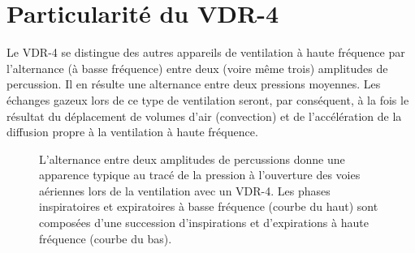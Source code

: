 \section{Particularité du VDR-4}
Le VDR-4 se distingue des autres appareils de ventilation à haute fréquence par l’alternance (à basse fréquence) entre deux (voire même trois) amplitudes de percussion. Il en résulte une alternance entre deux pressions moyennes. Les échanges gazeux lors de ce type de ventilation seront, par conséquent, à la fois le résultat du déplacement de volumes d’air (convection) et de l’accélération de la diffusion propre à la ventilation à haute fréquence.

\begin{figure}
	
	\caption{L’alternance entre deux amplitudes de percussions donne une apparence typique au tracé de la pression à l'ouverture des voies aériennes lors de la ventilation avec un VDR-4. Les phases inspiratoires et expiratoires à basse fréquence (courbe du haut) sont composées d’une succession d’inspirations et d’expirations à haute fréquence (courbe du bas).}
\end{figure}
